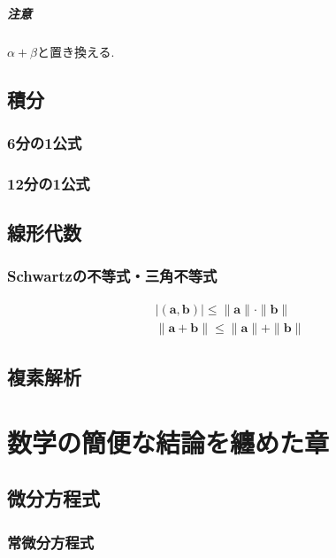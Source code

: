 \documentclass[a4paper, 12pt]{jsreport}
\begin{document}
\subsubsection{注意}
$\alpha+\beta$と置き換える.

\chapter{積分}
\section{6分の1公式}

\section{12分の1公式}

\chapter{線形代数}
\section{Schwartzの不等式・三角不等式}
\begin{equation}
    \begin{array}{l}
        |(\bm{a}, \bm{b})|\le\|\bm{a}\|\cdot\|\bm{b}\|\\
        \|\bm{a}+\bm{b}\|\le\|\bm{a}\|+\|\bm{b}\|
    \end{array}
\end{equation}

\chapter{複素解析}

\part{数学の簡便な結論を纏めた章}
\chapter{微分方程式}
\section{常微分方程式}
\end{document}
